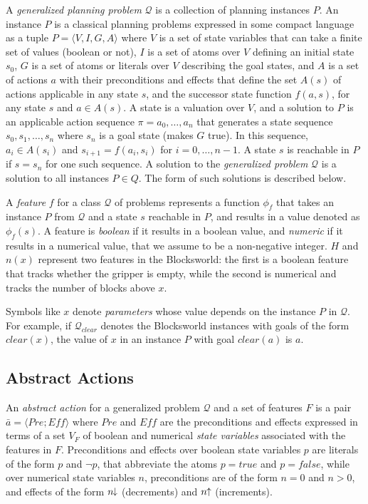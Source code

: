 \documentclass[letterpaper]{article} %
\newcommand{\tup}[1]{\langle #1 \rangle}
\newcommand{\Q}{\mathcal{Q}}
\newcommand{\Eff}{{\mathit{Eff}}}
\newcommand{\abst}[2]{\tup{#1;#2}}
\newcommand{\pplus}{\hspace{-.05em}\raisebox{.15ex}{\footnotesize$\uparrow$}}
\newcommand{\mminus}{\hspace{-.05em}\raisebox{.15ex}{\footnotesize$\downarrow$}}
\begin{document}
A \emph{generalized planning problem} $\Q$ is a collection of planning instances $P$.
An instance $P$ is a  classical planning problems expressed in some compact language
as a tuple $P=\tup{V,I,G,A}$ where $V$ is a set of state variables that can take a
finite set of values (boolean or not), $I$ is a set of atoms over $V$ defining an
initial state $s_0$, $G$ is a set of atoms or literals over $V$ describing the goal
states, and $A$ is a set of actions $a$ with their preconditions and effects that
define the set $A(s)$ of actions applicable in any state $s$, and the successor
state function $f(a,s)$, for any state $s$ and $a \in A(s)$.
A state is a valuation over $V$, and a solution to $P$ is an applicable action
sequence $\pi=a_0,\ldots,a_n$ that generates  a state sequence $s_0,s_1,\ldots,s_{n}$
where $s_n$ is a goal state (makes $G$ true). In this sequence, $a_i \in A(s_i)$
and $s_{i+1}=f(a_i,s_i)$ for $i=0, \ldots, n-1$. A state $s$ is reachable in $P$
if $s=s_n$ for one such sequence. A solution to the \emph{generalized problem}
$\Q$ is a solution to all instances $P \in Q$. The form of such solutions is
described below.

A \emph{feature} $f$ for a class $\Q$ of problems represents a function $\phi_f$
that takes an instance $P$ from $\Q$ and a state $s$ reachable in $P$, and results
in a value denoted as $\phi_f(s)$. 
A feature is \emph{boolean} if it results in a boolean value, and \emph{numeric}
if it results in a numerical value, that we assume to be a non-negative integer.
$H$ and $n(x)$ represent two features in the Blocksworld:
the first is a boolean feature that tracks whether the gripper is empty, while
the second is numerical and tracks the number of blocks above $x$. 

Symbols like $x$ denote \emph{parameters} whose value depends on the
instance $P$ in $\Q$. For example, if $\Q_{clear}$ denotes the Blocksworld
instances with goals of the form $clear(x)$, the value of $x$ in an instance
$P$ with goal $clear(a)$ is $a$.


\subsection{Abstract Actions}

An \emph{abstract action}  for a generalized problem $\Q$ and a set of features $F$
is a pair $\bar{a}=\abst{Pre}{\Eff}$ where $Pre$ and $\Eff$ are the  preconditions
and effects expressed in terms of a  set $V_F$ of boolean and numerical \emph{state variables}
associated with the features in $F$. Preconditions and effects over boolean state variables $p$ are literals of the form $p$
and $\neg p$, that abbreviate the  atoms $p=true$ and $p=false$, while  over  numerical state variables $n$,
preconditions are of  the form $n=0$ and $n > 0$, and effects  of the form $n\mminus$ (decrements) and
$n\pplus$ (increments).
\end{document}
